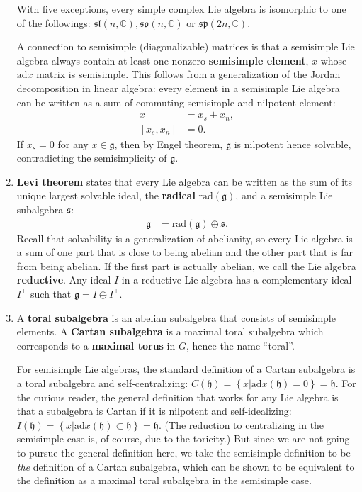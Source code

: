 \documentclass[aps,nofootinbib]{revtex4}
\begin{document}
\begin{enumerate}
With five exceptions, every simple complex Lie
algebra is isomorphic to one of the followings: $\mathfrak{sl}\left(n,\mathbb{C}\right),\mathfrak{so}\left(n,\mathbb{C}\right)$
or $\mathfrak{sp}\left(2n,\mathbb{C}\right)$.

A connection to semisimple (diagonalizable) matrices is that a semisimple
Lie algebra always contain at least one nonzero \textbf{semisimple
element}, $x$ whose $\mbox{ad}x$ matrix is semisimple. This follows
from a generalization of the Jordan decomposition in linear algebra:
every element in a semisimple Lie algebra can be written as a sum
of commuting semisimple and nilpotent element:
\begin{align*}
x & =x_{s}+x_{n},\\
\left[x_{s},x_{n}\right] & =0.
\end{align*}
If $x_{s}=0$ for any $x\in\mathfrak{g}$, then by Engel theorem,
$\mathfrak{g}$ is nilpotent hence solvable, contradicting the semisimplicity
of $\mathfrak{g}$.



\item \label{Levi} \textbf{Levi theorem }states that every Lie algebra can be written
as the sum of its unique largest solvable ideal, the \textbf{radical}
$\mbox{rad}\left(\mathfrak{g}\right)$, and a semisimple Lie subalgebra
$\mathfrak{s}$:
\begin{align*}
\mathfrak{g} & =\mbox{rad}\left(\mathfrak{g}\right)\oplus\mathfrak{s}.
\end{align*}
Recall that solvability is a generalization of abelianity, so every
Lie algebra is a sum of one part that is close to being abelian and
the other part that is far from being abelian. If the first part is
actually abelian, we call the Lie algebra \textbf{reductive}. Any ideal $I$ in a reductive Lie algebra has a complementary ideal $I^{\perp}$ such that $\mathfrak{g} = I \oplus I^{\perp}$.

\item A \textbf{toral subalgebra }is an abelian subalgebra that consists
of semisimple elements. A \textbf{Cartan subalgebra} is a maximal
toral subalgebra which corresponds to a \textbf{maximal torus} in $G$,
hence the name ``toral''.

For semisimple Lie algebras, the standard definition of a Cartan
subalgebra is a toral subalgebra and self-centralizing: $C\left(\mathfrak{h}\right)=\left\{ x|\mbox{ad}x\left(\mathfrak{h}\right)=0\right\} =\mathfrak{h}$.
For the curious reader, the general definition that works for any
Lie algebra is that a subalgebra is Cartan if it is nilpotent and
self-idealizing: $I\left(\mathfrak{h}\right)=\left\{ x|\mbox{ad}x\left(\mathfrak{h}\right)\subset\mathfrak{h}\right\} =\mathfrak{h}$.
(The reduction to centralizing in the semisimple case is, of course,
due to the toricity.) But since we are not going to pursue the general
definition here, we take the semisimple definition to be \emph{the}
definition of a Cartan subalgebra, which can be shown to be equivalent
to the definition as a maximal toral subalgebra in the semisimple
case.


\end{enumerate}
\end{document}
